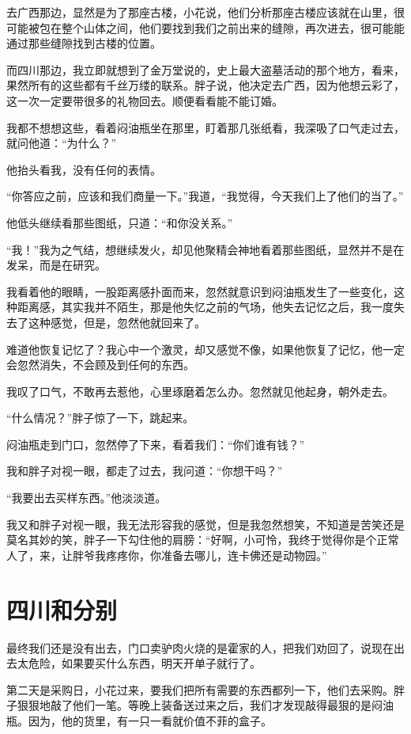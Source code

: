 去广西那边，显然是为了那座古楼，小花说，他们分析那座古楼应该就在山里，很可能被包在整个山体之间，他们要找到我们之前出来的缝隙，再次进去，很可能能通过那些缝隙找到古楼的位置。

而四川那边，我立即就想到了金万堂说的，史上最大盗墓活动的那个地方，看来，果然所有的这些都有千丝万缕的联系。胖子说，他决定去广西，因为他想云彩了，这一次一定要带很多的礼物回去。顺便看看能不能订婚。

我都不想想这些，看着闷油瓶坐在那里，盯着那几张纸看，我深吸了口气走过去，就问他道：“为什么？”

他抬头看我，没有任何的表情。

“你答应之前，应该和我们商量一下。”我道，“我觉得，今天我们上了他们的当了。”

他低头继续看那些图纸，只道：“和你没关系。”

“我！”我为之气结，想继续发火，却见他聚精会神地看着那些图纸，显然并不是在发呆，而是在研究。

我看着他的眼睛，一股距离感扑面而来，忽然就意识到闷油瓶发生了一些变化，这种距离感，其实我并不陌生，那是他失忆之前的气场，他失去记忆之后，我一度失去了这种感觉，但是，忽然他就回来了。

难道他恢复记忆了？我心中一个激灵，却又感觉不像，如果他恢复了记忆，他一定会忽然消失，不会顾及到任何的东西。

我叹了口气，不敢再去惹他，心里琢磨着怎么办。忽然就见他起身，朝外走去。

“什么情况？”胖子惊了一下，跳起来。

闷油瓶走到门口，忽然停了下来，看着我们：“你们谁有钱？”

我和胖子对视一眼，都走了过去，我问道：“你想干吗？”

“我要出去买样东西。”他淡淡道。

我又和胖子对视一眼，我无法形容我的感觉，但是我忽然想笑，不知道是苦笑还是莫名其妙的笑，胖子一下勾住他的肩膀：“好啊，小可怜，我终于觉得你是个正常人了，来，让胖爷我疼疼你，你准备去哪儿，连卡佛还是动物园。”

\chapter{四川和分别}

最终我们还是没有出去，门口卖驴肉火烧的是霍家的人，把我们劝回了，说现在出去太危险，如果要买什么东西，明天开单子就行了。

第二天是采购日，小花过来，要我们把所有需要的东西都列一下，他们去采购。胖子狠狠地敲了他们一笔。等晚上装备送过来之后，我们才发现敲得最狠的是闷油瓶。因为，他的货里，有一只一看就价值不菲的盒子。

